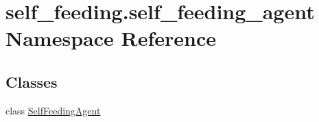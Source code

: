 \hypertarget{namespaceself__feeding_1_1self__feeding__agent}{}\section{self\+\_\+feeding.\+self\+\_\+feeding\+\_\+agent Namespace Reference}
\label{namespaceself__feeding_1_1self__feeding__agent}
\subsection*{Classes}
\begin{DoxyCompactItemize}
\item 
class \hyperlink{classself__feeding_1_1self__feeding__agent_1_1SelfFeedingAgent}{Self\+Feeding\+Agent}
\end{DoxyCompactItemize}
